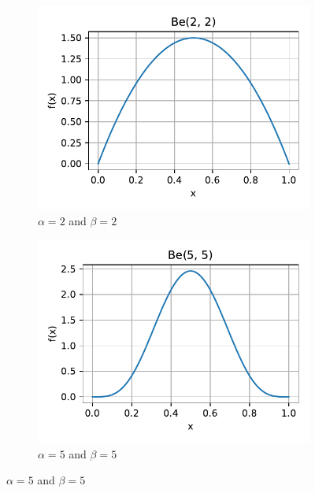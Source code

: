 \begin{figure}[H]
    \hfill
    \begin{subfigure}{0.3\textwidth}
        \centering
        \includegraphics[width=1\textwidth]{resources/figures/q1-beta_distr-alpha_2-beta_2.pdf}
        \caption{$\alpha = 2$ and $\beta = 2$}
        \label{q1-beta-distr-a_2-b_2}
    \end{subfigure}
    \vfill
    \vspace{0.5cm}
    \begin{subfigure}{0.3\textwidth}
        \centering
        \includegraphics[width=1\textwidth]{resources/figures/q1-beta_distr-alpha_5-beta_5.pdf}
        \caption{$\alpha = 5$ and $\beta = 5$}
        \label{q1-beta-distr-a_5-b_5}
    \end{subfigure}

\end{figure}
